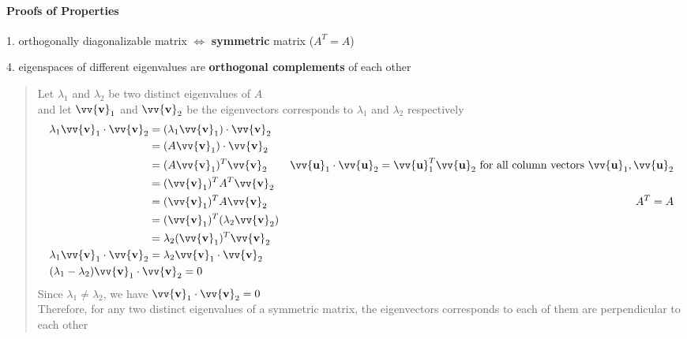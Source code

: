 \documentclass[11pt]{article}
\DeclareRobustCommand{\myvec}[1]{\vv{\mathbf{#1}}}
\newcommand{\mymat}[1]{#1}
\begin{document}
    \paragraph{Proofs of Properties}
    \noindent
    \begin{minipage}{\textwidth}
        1. orthogonally diagonalizable matrix $\iff$ \textbf{symmetric} matrix ($\mymat{A}^T = \mymat{A}$)    
    \end{minipage} \vspace{2ex}

    \noindent
    \begin{minipage}{\textwidth}
        4. eigenspaces of different eigenvalues are \textbf{orthogonal complements} of each other
        \begin{quote}
            Let $\lambda_1$ and $\lambda_2$ be two distinct eigenvalues of $\mymat{A}$ \\
            and let $\myvec{v}_1$ and $\myvec{v}_2$ be the eigenvectors corresponds to $\lambda_1$ and $\lambda_2$ respectively
            \begin{align*}
                \lambda_1 \myvec{v}_1 \cdot \myvec{v}_2 &= (\lambda_1 \myvec{v}_1) \cdot \myvec{v}_2 \\
                &= (\mymat{A} \myvec{v}_1) \cdot \myvec{v}_2 \\
                &= (\mymat{A} \myvec{v}_1)^T \myvec{v}_2 & \myvec{u}_1 \cdot \myvec{u}_2 = \myvec{u}_1^T \myvec{u}_2 \text{ for all column vectors } \myvec{u}_1, \myvec{u}_2 \\
                &= (\myvec{v}_1)^T \mymat{A}^T \myvec{v}_2 \\
                &= (\myvec{v}_1)^T \mymat{A} \myvec{v}_2 & \mymat{A}^T = \mymat{A}\\
                &= (\myvec{v}_1)^T (\lambda_2 \myvec{v}_2) \\
                &= \lambda_2 (\myvec{v}_1)^T \myvec{v}_2 \\
                \lambda_1 \myvec{v}_1 \cdot \myvec{v}_2 &= \lambda_2 \myvec{v}_1 \cdot \myvec{v}_2 \\
                \mathrlap{(\lambda_1 - \lambda_2) \myvec{v}_1 \cdot \myvec{v}_2 = 0 } \phantom{\lambda_1 \myvec{v}_1 \cdot \myvec{v}_2}
            \end{align*}
            Since $\lambda_1 \ne \lambda_2$, we have $\myvec{v}_1 \cdot \myvec{v}_2 = 0$ \\ 
            Therefore, for any two distinct eigenvalues of a symmetric matrix, the eigenvectors corresponds to each of them are perpendicular to each other
        \end{quote}
    \end{minipage}
\end{document}
